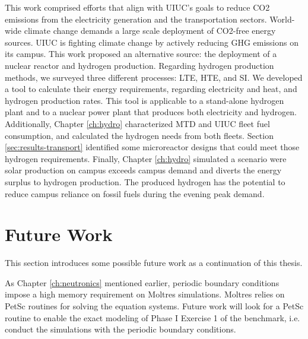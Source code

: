 This work comprised efforts that align with UIUC's goals to reduce \gls{CO2} emissions from the electricity generation and the transportation sectors.
World-wide climate change demands a large scale deployment of \gls{CO2}-free energy sources.
UIUC is fighting climate change by actively reducing GHG emissions on its campus.
This work proposed an alternative source: the deployment of a nuclear reactor and hydrogen production.
Regarding hydrogen production methods, we surveyed three different processes: LTE, HTE, and SI.
We developed a tool to calculate their energy requirements, regarding electricity and heat, and hydrogen production rates.
This tool is applicable to a stand-alone hydrogen plant and to a nuclear power plant that produces both electricity and hydrogen.
Additionally, Chapter \ref{ch:hydro} characterized MTD and UIUC fleet fuel consumption, and calculated the hydrogen needs from both fleets.
Section \ref{sec:results-transport} identified some microreactor designs that could meet those hydrogen requirements.
Finally, Chapter \ref{ch:hydro} simulated a scenario were solar production on campus exceeds campus demand and diverts the energy surplus to hydrogen production.
The produced hydrogen has the potential to reduce campus reliance on fossil fuels during the evening peak demand.

\section{Future Work}
\label{sec:futwork}

This section introduces some possible future work as a continuation of this thesis.

As Chapter \ref{ch:neutronics} mentioned earlier, periodic boundary conditions impose a high memory requirement on Moltres simulations.
Moltres relies on PetSc routines for solving the equation systems.
Future work will look for a PetSc routine to enable the exact modeling of Phase I Exercise 1 of the benchmark, i.e. conduct the simulations with the periodic boundary conditions.

